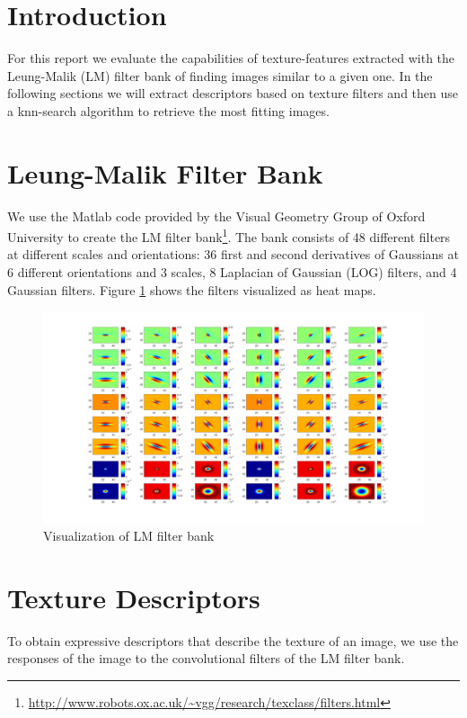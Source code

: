 \section{Introduction}

For this report we evaluate the capabilities of texture-features extracted with the Leung-Malik (LM) filter bank of finding images similar to a given one. In the following sections we will extract descriptors based on texture filters and then use a knn-search algorithm to retrieve the most fitting images.

\section{Leung-Malik Filter Bank}

We use the Matlab code provided by the Visual Geometry Group of Oxford University to create the LM filter bank\footnote{\url{http://www.robots.ox.ac.uk/\~vgg/research/texclass/filters.html}}. The bank consists of 48 different filters at different scales and orientations: 36 first and second derivatives of Gaussians at 6 different orientations and 3 scales, 8 Laplacian of Gaussian (LOG) filters, and 4 Gaussian filters. Figure \ref{fig:lmFilter} shows the filters visualized as heat maps.

\begin{figure}[!hbt]
  \includegraphics[width=\textwidth]{img/LM_filter_bank}
  \caption{Visualization of LM filter bank}
  \label{fig:lmFilter}
\end{figure}


\section{Texture Descriptors}

To obtain expressive descriptors that describe the texture of an image, we use the responses of the image to the convolutional filters of the LM filter bank. 

